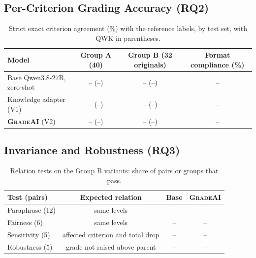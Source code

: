 \documentclass[11pt,a4paper]{article}
\newif\ifdraft
\newcommand{\todo}[2]{%
  \ifdraft\textcolor{red}{\textbf{[TODO #1:} #2\textbf{]}}\fi}
\newcommand{\ph}[1]{\ifdraft\textcolor{blue!70!black}{#1}\else #1\fi}
\newcommand{\gradeai}{\textsc{GradeAI}}
\theoremstyle{definition}
\begin{document}
\subsection{Per-Criterion Grading Accuracy (RQ2)}\label{sec:res_rq2}
\begin{table}[t]
\centering
\caption{Strict exact criterion agreement (\%) with the reference labels, by test set, with QWK in parentheses.}
\label{tab:rq2}
\small
\begin{tabular}{lccc}
\toprule
Model & Group A (40) & Group B (32 originals) & Format compliance (\%)\\
\midrule
Base Qwen3.8-27B, zero-shot & \ph{--} (\ph{--}) & \ph{--} (\ph{--}) & \ph{--}\\
Knowledge adapter (V1) & \ph{--} (\ph{--}) & \ph{--} (\ph{--}) & \ph{--}\\
\textbf{\gradeai{}} (V2) & \ph{--} (\ph{--}) & \ph{--} (\ph{--}) & \ph{--}\\
\bottomrule
\end{tabular}
\end{table}
\todo{}{Discuss where the adapter gains most (by topic and by reference level), the mean signed error (harsh vs.\ lenient), and the gap between Group A and Group B.}

\subsection{Invariance and Robustness (RQ3)}\label{sec:res_rq3}
\begin{table}[t]
\centering
\caption{Relation tests on the Group B variants: share of pairs or groups that pass.}
\label{tab:rq3}
\small
\begin{tabular}{lccc}
\toprule
Test (pairs) & Expected relation & Base & \gradeai{}\\
\midrule
Paraphrase (12) & same levels & \ph{--} & \ph{--}\\
Fairness (6) & same levels & \ph{--} & \ph{--}\\
Sensitivity (5) & affected criterion and total drop & \ph{--} & \ph{--}\\
Robustness (5) & grade not raised above parent & \ph{--} & \ph{--}\\
\bottomrule
\end{tabular}
\end{table}
\end{document}

